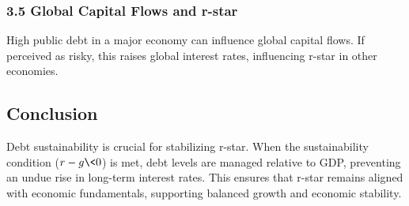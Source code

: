 \documentclass[
  letterpaper,
  DIV=11,
  numbers=noendperiod]{scrartcl}
\begin{document}
\subsubsection{3.5 Global Capital Flows and
r-star}\label{global-capital-flows-and-r-star}

High public debt in a major economy can influence global capital flows.
If perceived as risky, this raises global interest rates, influencing
r-star in other economies.

\subsection{Conclusion}\label{conclusion}

Debt sustainability is crucial for stabilizing r-star. When the
sustainability condition (\(r - g \< 0\)) is met, debt levels are
managed relative to GDP, preventing an undue rise in long-term interest
rates. This ensures that r-star remains aligned with economic
fundamentals, supporting balanced growth and economic stability.
\end{document}
